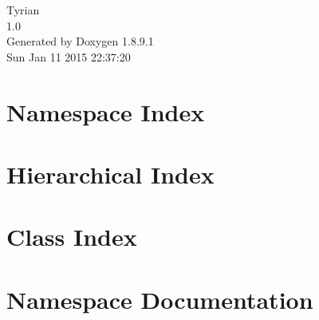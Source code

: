 \documentclass[twoside]{book}
\newcommand{\+}{\discretionary{\mbox{\scriptsize$\hookleftarrow$}}{}{}}
\newcommand{\clearemptydoublepage}{%
  \newpage{\pagestyle{empty}\cleardoublepage}%
}
\begin{document}
\hypersetup{pageanchor=false,
             bookmarks=true,
             bookmarksnumbered=true,
             pdfencoding=unicode
            }
\begin{titlepage}
\vspace*{7cm}
\begin{center}%
{\Large Tyrian \\[1ex]\large 1.\+0 }\\
\vspace*{1cm}
{\large Generated by Doxygen 1.8.9.1}\\
\vspace*{0.5cm}
{\small Sun Jan 11 2015 22:37:20}\\
\end{center}
\end{titlepage}
\clearemptydoublepage
\tableofcontents
\clearemptydoublepage
{}
\hypersetup{pageanchor=true}

\chapter{Namespace Index}

\chapter{Hierarchical Index}

\chapter{Class Index}

\chapter{Namespace Documentation}

\end{document}
